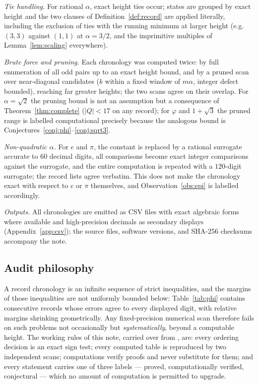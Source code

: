 \documentclass[11pt]{article}
\theoremstyle{definition}
\theoremstyle{remark}
\begin{document}
\emph{Tie handling.} For rational $\alpha$, exact height ties occur; states are grouped by exact height and the two clauses of Definition~\ref{def:record} are applied literally, including the exclusion of ties with the running minimum at larger height (e.g.\ $(3,3)$ against $(1,1)$ at $\alpha=3/2$, and the imprimitive multiples of Lemma~\ref{lem:scaling} everywhere).

\emph{Brute force and pruning.} Each chronology was computed twice: by full enumeration of all odd pairs up to an exact height bound, and by a pruned scan over near-diagonal candidates ($k$ within a fixed window of $m\alpha$, integer defect bounded), reaching far greater heights; the two scans agree on their overlap. For $\alpha=\sqrt2$ the pruning bound is not an assumption but a consequence of Theorem~\ref{thm:complete} ($|Q|<17$ on any record); for $\varphi$ and $1+\sqrt3$ the pruned range is labelled computational precisely because the analogous bound is Conjectures~\ref{conj:phi}--\ref{conj:sqrt3}.

\emph{Non-quadratic $\alpha$.} For $e$ and $\pi$, the constant is replaced by a rational surrogate accurate to $60$ decimal digits, all comparisons become exact integer comparisons against the surrogate, and the entire computation is repeated with a $120$-digit surrogate; the record lists agree verbatim. This does not make the chronology exact with respect to $e$ or $\pi$ themselves, and Observation~\ref{obs:epi} is labelled accordingly.

\emph{Outputs.} All chronologies are emitted as CSV files with exact algebraic forms where available and high-precision decimals as secondary displays (Appendix~\ref{app:csv}); the source files, software versions, and SHA-256 checksums accompany the note.

\subsection{Audit philosophy}

A record chronology is an infinite sequence of strict inequalities, and the margins of those inequalities are not uniformly bounded below: Table~\ref{tab:phi} contains consecutive records whose errors agree to every displayed digit, with relative margins shrinking geometrically. Any fixed-precision numerical scan therefore fails on such problems not occasionally but \emph{systematically}, beyond a computable height. The working rules of this note, carried over from \cite{pellspine,quartercircle}, are: every ordering decision is an exact sign test; every computed table is reproduced by two independent scans; computations verify proofs and never substitute for them; and every statement carries one of three labels --- proved, computationally verified, conjectural --- which no amount of computation is permitted to upgrade.
\end{document}
